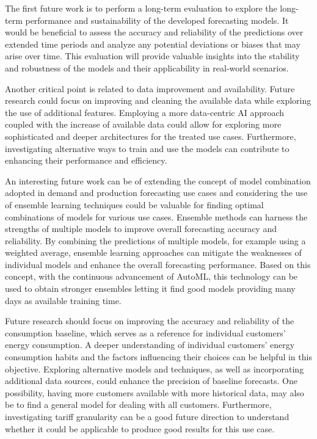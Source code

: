The first future work is to perform a long-term evaluation to explore the long-term performance and sustainability of the developed forecasting models.
It would be beneficial to assess the accuracy and reliability of the predictions over extended time periods and analyze any potential deviations or biases that may arise over time.
This evaluation will provide valuable insights into the stability and robustness of the models and their applicability in real-world scenarios.

Another critical point is related to data improvement and availability.
Future research could focus on improving and cleaning the available data while exploring the use of additional features.
Employing a more data-centric AI approach coupled with the increase of available data could allow for exploring more sophisticated and deeper architectures for the treated use cases.
Furthermore, investigating alternative ways to train and use the models can contribute to enhancing their performance and efficiency.

An interesting future work can be of extending the concept of model combination adopted in demand and production forecasting use cases and considering the use of ensemble learning techniques could be valuable for finding optimal combinations of models for various use cases.
Ensemble methods can harness the strengths of multiple models to improve overall forecasting accuracy and reliability.
By combining the predictions of multiple models, for example using a weighted average, ensemble learning approaches can mitigate the weaknesses of individual models and enhance the overall forecasting performance.
Based on this concept, with the continuous advancement of AutoML, this technology can be used to obtain stronger ensembles letting it find good models providing many days as available training time.

Future research should focus on improving the accuracy and reliability of the consumption baseline, which serves as a reference for individual customers' energy consumption.
A deeper understanding of individual customers' energy consumption habits and the factors influencing their choices can be helpful in this objective.
Exploring alternative models and techniques, as well as incorporating additional data sources, could enhance the precision of baseline forecasts.
One possibility, having more customers available with more historical data, may also be to find a general model for dealing with all customers.
Furthermore, investigating tariff granularity can be a good future direction to understand whether it could be applicable to produce good results for this use case.

